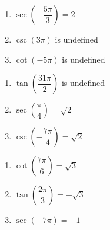 \begin{multicols}{3}

\begin{enumerate}

\setcounter{enumi}{\value{HW}}

\item $\sec \left( -\dfrac{5\pi}{3} \right) = 2$
\item $\csc \left( 3\pi \right)$ is undefined 
\item $\cot \left( -5\pi \right)$ is undefined 

\setcounter{HW}{\value{enumi}}

\end{enumerate}

\end{multicols}

\begin{multicols}{3}

\begin{enumerate}

\setcounter{enumi}{\value{HW}}

\item $\tan \left( \dfrac{31\pi}{2} \right)$ is undefined
\item $\sec \left( \dfrac{\pi}{4} \right) = \sqrt{2}$ 
\item $\csc \left( -\dfrac{7\pi}{4} \right) = \sqrt{2}$

\setcounter{HW}{\value{enumi}}

\end{enumerate}

\end{multicols}

\begin{multicols}{3}

\begin{enumerate}

\setcounter{enumi}{\value{HW}}

\item $\cot \left( \dfrac{7\pi}{6} \right) = \sqrt{3}$
\item $\tan \left( \dfrac{2\pi}{3} \right) = -\sqrt{3}$
\item $\sec \left( -7\pi \right) = -1$ 

\setcounter{HW}{\value{enumi}}

\end{enumerate}

\end{multicols}

